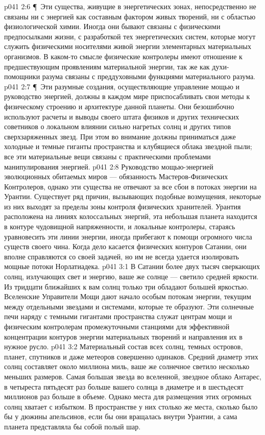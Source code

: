 \vs p041 2:6 \P\ Эти существа, живущие в энергетических зонах, непосредственно не связаны ни с энергией как составным фактором живых творений, ни с областью физиологической химии. Иногда они бывают связаны с физическими предпосылками жизни, с разработкой тех энергетических систем, которые могут служить физическими носителями живой энергии элементарных материальных организмов. В каком\hyp{}то смысле физические контролеры имеют отношение к предшествующим проявлениям материальной энергии, так же как духи\hyp{}помощники разума связаны с преддуховными функциями материального разума.
\vs p041 2:7 \P\ Эти разумные создания, осуществляющие управление мощью и руководство энергией, должны в каждом мире приспосабливать свои методы к физическому строению и архитектуре данной планеты. Они безошибочно используют расчеты и выводы своего штата физиков и других технических советников о локальном влиянии сильно нагретых солнц и других типов сверхзаряженных звезд. При этом во внимание должны приниматься даже холодные и темные гиганты пространства и клубящиеся облака звездной пыли; все эти материальные вещи связаны с практическими проблемами манипулирования энергией.
\vs p041 2:8 Руководство мощью\hyp{}энергией эволюционных обитаемых миров --- обязанность Мастеров\hyp{}Физических Контролеров, однако эти существа не отвечают за все сбои в потоках энергии на Урантии. Существует ряд причин, вызывающих подобные возмущения, некоторые из них выходят за пределы зоны контроля физических хранителей. Урантия расположена на линиях колоссальных энергий, эта небольшая планета находится в контуре чудовищной напряженности, и локальные контролеры, стараясь уравновесить эти линии энергии, иногда прибегают к помощи огромного числа существ своего чина. Когда дело касается физических контуров Сатании, они вполне справляются со своей задачей, но им не всегда удается изолировать мощные потоки Норлатиадека.
\vs p041 3:1 В Сатании более двух тысяч сверкающих солнц, излучающих свет и энергию, ваше же солнце --- светило средней яркости. Из тридцати ближайших к вам солнц только три обладают большей яркостью. Вселенские Управители Мощи дают начало особым потокам энергии, текущим между отдельными звездами и системами, которые те образуют. Эти солнечные печи наряду с темными гигантами пространства служат центрам мощи и физическим контролерам промежуточными станциями для эффективной концентрации контуров энергии материальных творений и направления их в нужное русло.
\vs p041 3:2 Материальный состав всех солнц, темных островов, планет, спутников и даже метеоров совершенно одинаков. Средний диаметр этих солнц составляет около миллиона миль, ваше же солнечное светило несколько меньших размеров. Самая большая звезда во вселенной, звездное облако Антарес, в четыреста пятьдесят раз больше вашего солнца в диаметре и в шестьдесят миллионов раз больше в объеме. Однако места для размещения этих огромных солнц хватает с избытком. В пространстве у них столько же места, сколько было бы у дюжины апельсинов, если бы они вращалась внутри Урантии, а сама планета представляла бы собой полый шар.
